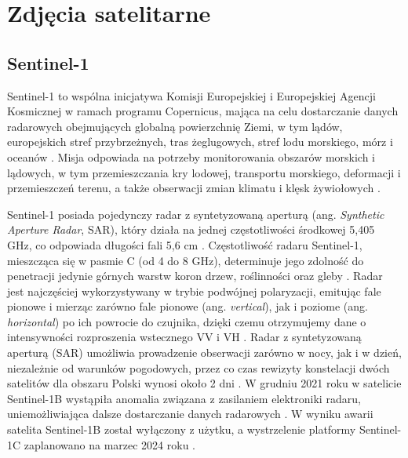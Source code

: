 \documentclass{amuthesis}
\begin{document}
\hypertarget{sec-satellite-imagery}{%
\section{Zdjęcia satelitarne}\label{sec-satellite-imagery}}

\hypertarget{sec-sentinel1}{%
\subsection{Sentinel-1}\label{sec-sentinel1}}

Sentinel-1 to wspólna inicjatywa Komisji Europejskiej i Europejskiej
Agencji Kosmicznej w ramach programu Copernicus, mająca na celu
dostarczanie danych radarowych obejmujących globalną powierzchnię Ziemi,
w tym lądów, europejskich stref przybrzeżnych, tras żeglugowych, stref
lodu morskiego, mórz i oceanów
\autocite{hejmanowska_2020_dane,sentinel1_mission_objectives}. Misja
odpowiada na potrzeby monitorowania obszarów morskich i lądowych, w tym
przemieszczania kry lodowej, transportu morskiego, deformacji i
przemieszczeń terenu, a także obserwacji zmian klimatu i klęsk
żywiołowych
\autocite{hejmanowska_2020_dane,sentinel1_mission_objectives}.

Sentinel-1 posiada pojedynczy radar z syntetyzowaną aperturą (ang.
\emph{Synthetic Aperture Radar}, SAR), który działa na jednej
częstotliwości środkowej 5,405 GHz, co odpowiada długości fali 5,6 cm
\autocite{sentinel1_lulc,sentinel1_instrument_payload}. Częstotliwość
radaru Sentinel-1, mieszcząca się w pasmie C (od 4 do 8 GHz),
determinuje jego zdolność do penetracji jedynie górnych warstw koron
drzew, roślinności oraz gleby \autocite{sentinel_1_user_guide}. Radar
jest najczęściej wykorzystywany w trybie podwójnej polaryzacji, emitując
fale pionowe i mierząc zarówno fale pionowe (ang. \emph{vertical}), jak
i poziome (ang. \emph{horizontal}) po ich powrocie do czujnika, dzięki
czemu otrzymujemy dane o intensywności rozproszenia wstecznego VV i VH
\autocite{sentinel1_lulc}. Radar z syntetyzowaną aperturą (SAR)
umożliwia prowadzenie obserwacji zarówno w nocy, jak i w dzień,
niezależnie od warunków pogodowych, przez co czas rewizyty konstelacji
dwóch satelitów dla obszaru Polski wynosi około 2 dni
\autocite{attema_2008_s1,sentinel1_revisit}. W grudniu 2021 roku w
satelicie Sentinel-1B wystąpiła anomalia związana z zasilaniem
elektroniki radaru, uniemożliwiająca dalsze dostarczanie danych
radarowych \autocite{sentinel_1b}. W wyniku awarii satelita Sentinel-1B
został wyłączony z użytku, a wystrzelenie platformy Sentinel-1C
zaplanowano na marzec 2024 roku
\autocite{sentinel_1b,sentinel1_eoportal}.
\end{document}
